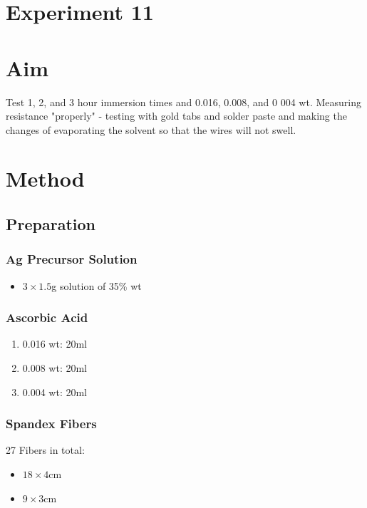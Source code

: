 \documentclass{article}
\begin{document}
\section*{Experiment 11}

\section{Aim}
Test 1, 2, and 3 hour immersion times and 0.016, 0.008, and 0
004 wt. Measuring resistance "properly" - testing with gold tabs and solder paste and making the changes of evaporating the solvent so that the wires will not swell.

\section{Method}
\subsection{Preparation}
\subsubsection{Ag Precursor Solution}
\begin{itemize}
    \item  $3 \times 1.5$g solution of  35\% wt
\end{itemize}

\subsubsection{Ascorbic Acid}
\begin{enumerate}
    \item 0.016 wt: 20ml
    \item 0.008 wt: 20ml
    \item 0.004 wt: 20ml
\end{enumerate}

\subsubsection{Spandex Fibers}
27 Fibers in total:
\begin{itemize}
    \item $18\times 4$cm
    \item $9\times 3$cm
\end{itemize}
\end{document}
